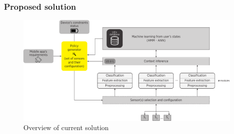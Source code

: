 \documentclass[compress,9pt,xcolor={dvipsnames,table}]{beamer}
\begin{document}
\begin{frame}\frametitle{Proposed solution}
\begin{figure}[tb]
  \centering
  \includegraphics[width=\textwidth]{../../../resources/images/vectors/policy-manager-incorporation}
  \caption{Overview of current solution}
  \label{fig:solution}
\end{figure}
\end{frame}
\end{document}
